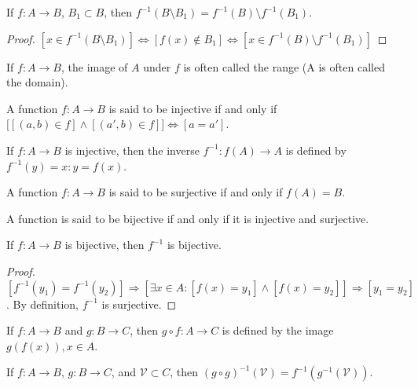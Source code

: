 \documentclass[crop=false,class=book,oneside]{standalone}
\begin{document}
        \begin{theorem}
        If $f:A\rightarrow B$, $B_1 \subset B$, then $f^{-1}(B\setminus B_1) = f^{-1}(B)\setminus f^{-1}(B_1)$.
        \end{theorem}
        \begin{proof}
        $[x\in f^{-1}(B\setminus B_1)]\Leftrightarrow [f(x)\notin B_1]\Leftrightarrow [x\in f^{-1}(B)\setminus f^{-1}(B_1)]$
        \end{proof}
        \begin{remark}
        If $f:A\rightarrow B$, the image of $A$ under $f$ is often called the range (A is often called the domain).
        \end{remark}
        \begin{definition}
        A function $f:A\rightarrow B$ is said to be injective if and only if $\big[[(a,b)\in f]\land[(a',b)\in f]\big]\Leftrightarrow [a=a']$.
        \end{definition}
        \begin{definition}
        If $f:A\rightarrow B$ is injective, then the inverse $f^{-1}:f(A)\rightarrow A$ is defined by $f^{-1}(y)=x:y=f(x)$.
        \end{definition}
        \begin{definition}
        A function $f:A\rightarrow B$ is said to be surjective if and only if $f(A) = B$.
        \end{definition}
        \begin{definition}
        A function is said to be bijective if and only if it is injective and surjective.
        \end{definition}
        \begin{theorem}
        If $f:A\rightarrow B$ is bijective, then $f^{-1}$ is bijective.
        \end{theorem}
        \begin{proof}
        $[f^{-1}(y_1) = f^{-1}(y_2)]\Rightarrow [\exists x\in A:[f(x) = y_1]\land [f(x)=y_2]]\Rightarrow [y_1=y_2]$. By definition, $f^{-1}$ is surjective.
        \end{proof}
        \begin{definition}
        If $f:A\rightarrow B$ and $g:B\rightarrow C$, then $g\circ f:A\rightarrow C$ is defined by the image $g(f(x)), x\in A$. 
        \end{definition}
        \begin{theorem}
        If $f:A\rightarrow B$, $g:B\rightarrow C$, and $\mathcal{V}\subset C$, then $(g\circ g)^{-1}(\mathcal{V}) = f^{-1}(g^{-1}(\mathcal{V}))$.
        \end{theorem}
\end{document}
